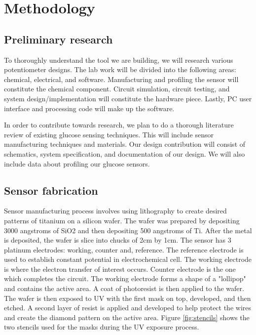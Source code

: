\section{Methodology}

\subsection{Preliminary research}
To thoroughly understand the tool we are building, we will research various potentiometer designs. The lab work will be divided into the following areas: chemical, electrical, and software. Manufacturing and profiling the sensor will constitute the chemical component. Circuit simulation, circuit testing, and system design/implementation will constitute the hardware piece. Lastly, PC user interface and processing code will make up the software.

In order to contribute towards research, we plan to do a thorough literature review of existing glucose sensing techniques. This will include sensor manufacturing techniques and materials. Our design contribution will consist of schematics, system specification, and documentation of our design. We will also include data about profiling our glucose sensors.

\subsection{Sensor fabrication}
Sensor manufacturing process involves using lithography to create desired patterns of titanium on a silicon wafer. The wafer was prepared by depositing 3000 angstroms of SiO2 and then depositing 500 angstroms of Ti. After the metal is deposited, the wafer is slice into chucks of 2cm by 1cm. The sensor has 3 platinum electrodes: working, counter and, reference. The reference electrode is used to establish constant potential in electrochemical cell. The working electrode is where the electron transfer of interest occurs. Counter electrode is the one which completes the circuit. The working electrode forms a shape of a "lollipop" and contains the active area. A coat of photoresist is then applied to the wafer. The wafer is then exposed to UV with the first mask on top, developed, and then etched. A second layer of resist is applied and developed to help protect the wires and create the diamond pattern on the active area. Figure \ref{fig:stencils} shows the two stencils used for the masks during the UV exposure process. 

